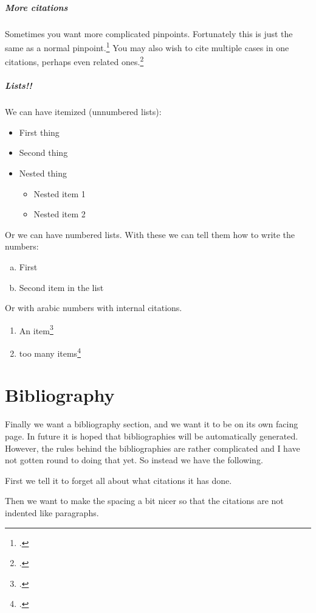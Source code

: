 \documentclass{nzlaw}
\begin{document}
\subparagraph{More citations}
Sometimes you want more complicated pinpoints. Fortunately this is
just the same as a normal pinpoint.\footcite[{[48]} per Tipping J]{mafart}
You may also wish to cite multiple cases in one citations, perhaps
even related ones.\footcites{foodstuffs}[rev'd][]{foodstuffs1}

\subparagraph{Lists!!}

We can have itemized (unnumbered lists):

\begin{itemize}
\item First thing
\item Second thing
\item Nested thing
\begin{itemize}
 \item Nested item 1
 \item Nested item 2
\end{itemize}
\end{itemize}

Or we can have numbered lists. With these we can tell them how
to write the numbers:

\begin{enumerate}[(a)]
\item First
\item Second item in the list
\end{enumerate}

Or with arabic numbers with internal citations. 
\begin{enumerate}[(1)]
\item An item\footcite{reekie}
\item too many items\footcite{tuhou}
\end{enumerate}

\cleardoublepage

\section{Bibliography}

Finally we want a bibliography section, and we want it to be on its own
facing page. In future it is hoped that 
bibliographies will be automatically generated. However, the rules
behind the bibliographies are rather complicated and I have not
gotten round to doing that yet. So instead we have the following.

First we tell it to forget all about what citations it has done.
\newrefsection

Then we want to make the spacing a bit nicer so that the citations are
not indented like paragraphs.
\parindent=0pt
\end{document}
